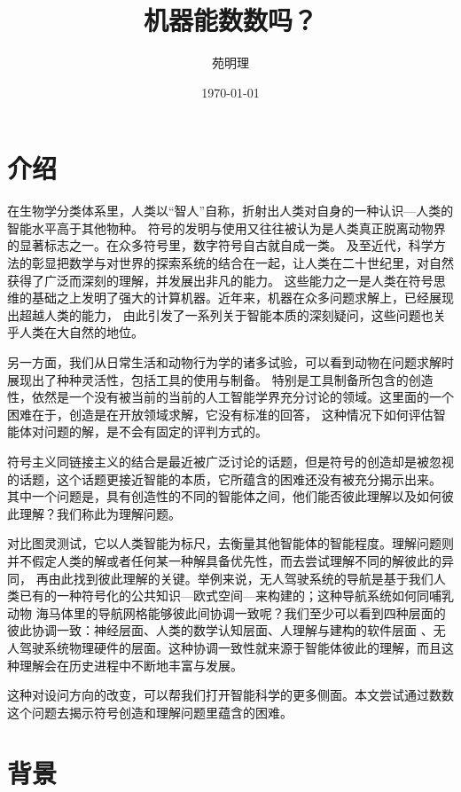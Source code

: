 \documentclass[a4paper,12pt]{article}
\title{机器能数数吗？}
\author{苑明理}
\date{\monthyeardate\today}
\begin{document}
\begingroup
\let\newpage\relax
\maketitle
\endgroup

\renewcommand\contentsname{目录}
\setcounter{tocdepth}{2}
\tableofcontents

\newpage

\section{介绍}

在生物学分类体系里，人类以“智人”自称，折射出人类对自身的一种认识—人类的智能水平高于其他物种。
符号的发明与使用又往往被认为是人类真正脱离动物界的显著标志之一。在众多符号里，数字符号自古就自成一类。
及至近代，科学方法的彰显把数学与对世界的探索系统的结合在一起，让人类在二十世纪里，对自然获得了广泛而深刻的理解，并发展出非凡的能力。
这些能力之一是人类在符号思维的基础之上发明了强大的计算机器。近年来，机器在众多问题求解上，已经展现出超越人类的能力，
由此引发了一系列关于智能本质的深刻疑问，这些问题也关乎人类在大自然的地位。

另一方面，我们从日常生活和动物行为学的诸多试验，可以看到动物在问题求解时展现出了种种灵活性，包括工具的使用与制备。
特别是工具制备所包含的创造性，依然是一个没有被当前的当前的人工智能学界充分讨论的领域。这里面的一个困难在于，创造是在开放领域求解，它没有标准的回答，
这种情况下如何评估智能体对问题的解，是不会有固定的评判方式的。

符号主义同链接主义的结合是最近被广泛讨论的话题，但是符号的创造却是被忽视的话题，这个话题更接近智能的本质，它所蕴含的困难还没有被充分揭示出来。
其中一个问题是，具有创造性的不同的智能体之间，他们能否彼此理解以及如何彼此理解？我们称此为理解问题。

对比图灵测试，它以人类智能为标尺，去衡量其他智能体的智能程度。理解问题则并不假定人类的解或者任何某一种解具备优先性，而去尝试理解不同的解彼此的异同，
再由此找到彼此理解的关键。举例来说，无人驾驶系统的导航是基于我们人类已有的一种符号化的公共知识—欧式空间—来构建的；这种导航系统如何同哺乳动物
海马体里的导航网格能够彼此间协调一致呢？我们至少可以看到四种层面的彼此协调一致：神经层面、人类的数学认知层面、人理解与建构的软件层面
、无人驾驶系统物理硬件的层面。这种协调一致性就来源于智能体彼此的理解，而且这种理解会在历史进程中不断地丰富与发展。

这种对设问方向的改变，可以帮我们打开智能科学的更多侧面。本文尝试通过数数这个问题去揭示符号创造和理解问题里蕴含的困难。

\section{背景}
\end{document}
